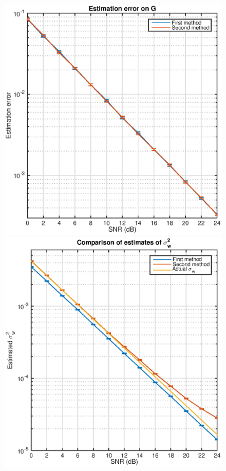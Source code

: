 \documentclass[10pt]{article}
\begin{document}
\begin{figure}
\centering
\begin{minipage}{0.49\textwidth}
\centering
\includegraphics[width=\textwidth]{p3_comparison_estimerror}
\end{minipage}\hfill
\begin{minipage}{0.49\textwidth}
\centering
\includegraphics[width=\textwidth]{p3_comparison_noise}

\end{minipage}
\end{figure}
\end{document}

